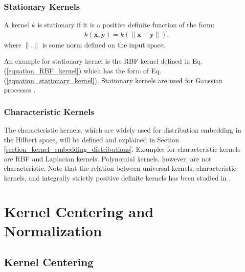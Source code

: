 \documentclass[lang=cn,10pt]{gorgeousnbook}
\numberwithin{equation}{section}%
\numberwithin{figure}{section}%
\begin{document}
\subsubsection{Stationary Kernels}



\begin{definition}
A kernel $k$ is stationary if it is a positive definite function of the form:
\begin{align}\label{equation_stationary_kernel}
k(\boldsymbol{x}, \boldsymbol{y}) = k(\|\boldsymbol{x} - \boldsymbol{y}\|),
\end{align}
where $\|.\|$ is some norm defined on the input space. 
\end{definition}
An example for stationary kernel is the RBF kernel defined in Eq. (\ref{equation_RBF_kernel}) which has the form of Eq. (\ref{equation_stationary_kernel}). 
Stationary kernels are used for Gaussian processes \cite{noack2021advanced}. 

\subsubsection{Characteristic Kernels}

The characteristic kernels, which are widely used for distribution embedding in the Hilbert space, will be defined and explained in Section \ref{section_kernel_embedding_distributions}.
Examples for characteristic kernels are RBF and Laplacian kernels. Polynomial kernels. however, are not characteristic.
Note that the relation between universal kernels, characteristic kernels, and integrally strictly positive definite kernels has been studied in \cite{sriperumbudur2011universality}.








\section{Kernel Centering and Normalization}\label{section_kernel_centering_normalization}

\subsection{Kernel Centering}\label{section_kernel_centering}
\end{document}
